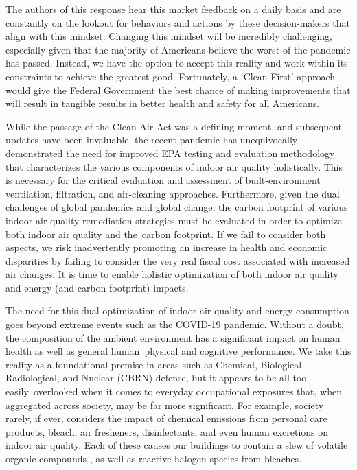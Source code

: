 The authors of this response hear this market feedback on a daily basis and are constantly on the lookout for behaviors and actions by these decision-makers that align with this mindset. Changing this mindset will be incredibly challenging, especially given that the majority of Americans believe the worst of the pandemic has passed. Instead, we have the option to accept this reality and work within its constraints to achieve the greatest good.  Fortunately, a \lq Clean First' \citep{enVerid, enVeridWhitePaper} approach would give the Federal Government the best chance of making improvements that will result in tangible results in better health and safety for all Americans.

While the passage of the Clean Air Act was a defining moment, and subsequent updates have been invaluable, the recent pandemic has unequivocally demonstrated the need for improved EPA testing and evaluation methodology that characterizes the various components of indoor air quality holistically. This is necessary for the critical evaluation and assessment of built-environment ventilation, filtration, and air-cleaning approaches. Furthermore, given the dual challenges of global pandemics and global change, the carbon footprint of various indoor air quality remediation strategies must be evaluated in order to optimize both indoor air quality and the carbon footprint. If we fail to consider both aspects, we risk inadvertently promoting an increase in health and economic disparities by failing to consider the very real fiscal cost associated with increased air changes. It is time to enable holistic optimization of both indoor air quality and energy (and carbon footprint) impacts.

The need for this dual optimization of indoor air quality and energy consumption goes beyond extreme events such as the COVID-19 pandemic. Without a doubt, the composition of the ambient environment has a significant impact on human health as well as general human physical and cognitive performance. We take this reality as a foundational premise in areas such as Chemical, Biological, Radiological, and Nuclear (CBRN) defense, but it appears to be all too easily overlooked when it comes to everyday occupational exposures that, when aggregated across society, may be far more significant. For example, society rarely, if ever, considers the impact of chemical emissions from personal care products, bleach, air fresheners, disinfectants, and even human excretions on indoor air quality. Each of these causes our buildings to contain a slew of volatile organic compounds \cite{finewax_quantification_2021}, as well as reactive halogen species from bleaches.


